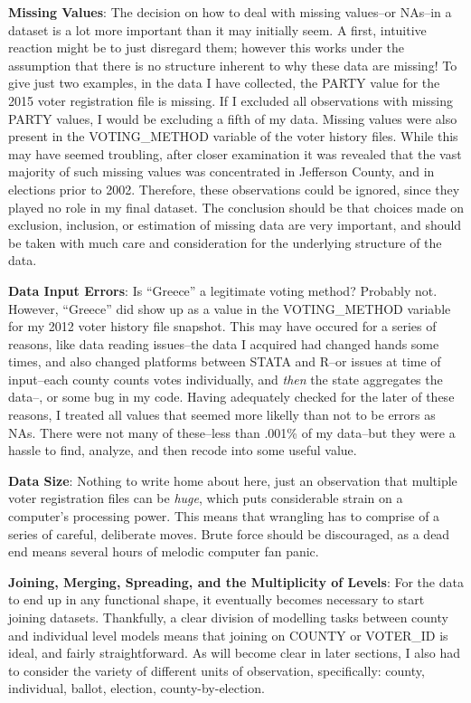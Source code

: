 \documentclass[12pt,twoside]{reedthesis}
\begin{document}
  \textbf{Missing Values}: The decision on how to deal with missing
  values--or NAs--in a dataset is a lot more important than it may
  initially seem. A first, intuitive reaction might be to just disregard
  them; however this works under the assumption that there is no structure
  inherent to why these data are missing! To give just two examples, in
  the data I have collected, the PARTY value for the 2015 voter
  registration file is missing. If I excluded all observations with
  missing PARTY values, I would be excluding a fifth of my data. Missing
  values were also present in the VOTING\_METHOD variable of the voter
  history files. While this may have seemed troubling, after closer
  examination it was revealed that the vast majority of such missing
  values was concentrated in Jefferson County, and in elections prior to
  2002. Therefore, these observations could be ignored, since they played
  no role in my final dataset. The conclusion should be that choices made
  on exclusion, inclusion, or estimation of missing data are very
  important, and should be taken with much care and consideration for the
  underlying structure of the data.
  
  \textbf{Data Input Errors}: Is ``Greece'' a legitimate voting method?
  Probably not. However, ``Greece'' did show up as a value in the
  VOTING\_METHOD variable for my 2012 voter history file snapshot. This
  may have occured for a series of reasons, like data reading issues--the
  data I acquired had changed hands some times, and also changed platforms
  between STATA and R--or issues at time of input--each county counts
  votes individually, and \emph{then} the state aggregates the data--, or
  some bug in my code. Having adequately checked for the later of these
  reasons, I treated all values that seemed more likelly than not to be
  errors as NAs. There were not many of these--less than .001\% of my
  data--but they were a hassle to find, analyze, and then recode into some
  useful value.
  
  \textbf{Data Size}: Nothing to write home about here, just an
  observation that multiple voter registration files can be \emph{huge},
  which puts considerable strain on a computer's processing power. This
  means that wrangling has to comprise of a series of careful, deliberate
  moves. Brute force should be discouraged, as a dead end means several
  hours of melodic computer fan panic.
  
  \textbf{Joining, Merging, Spreading, and the Multiplicity of Levels}:
  For the data to end up in any functional shape, it eventually becomes
  necessary to start joining datasets. Thankfully, a clear division of
  modelling tasks between county and individual level models means that
  joining on COUNTY or VOTER\_ID is ideal, and fairly straightforward. As
  will become clear in later sections, I also had to consider the variety
  of different units of observation, specifically: county, individual,
  ballot, election, county-by-election.
  
\end{document}
